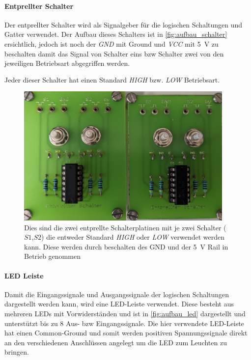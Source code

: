 \documentclass[12pt,english,ngerman]{scrartcl}
\begin{document}
\paragraph{Entprellter Schalter}
Der entprellter Schalter wird als Signalgeber für die logischen Schaltungen und
Gatter verwendet. Der Aufbau dieses Schalters ist in
\autoref{fig:aufbau_schalter} ersichtlich, jedoch ist noch der \textit{GND} mit
Ground und \textit{VCC} mit \SI{5}{\volt} zu beschalten damit das Signal von
Schalter eins bzw Schalter zwei von den jeweiligen Betriebsart abgegriffen
werden.

Jeder dieser Schalter hat einen Standard \textit{HIGH} bzw.
\textit{LOW} Betriebsart.

\begin{figure}[H]
  \centering
    \includegraphics[width=0.95\textwidth]{./figures/messungen/schalter.jpg}
  \caption{Dies sind die zwei entprellte Schalterplatinen mit je zwei Schalter
    ($S1$,$S2$) die entweder Standard \textit{HIGH} oder \textit{LOW} verwendet
    werden kann. Diese werden durch beschalten des GND und der \SI{5}{\volt}
    Rail in Betrieb genommen}
  \label{fig:aufbau_schalter}
\end{figure}


\paragraph{LED Leiste}
Damit die Eingangssignale und Ausgangssignale der logischen Schaltungen
dargestellt werden kann, wird eine LED-Leiste verwendet. Diese besteht aus
mehreren LEDs mit Vorwiderständen und ist in \autoref{fig:aufbau_led} dargestellt und
unterstützt bis zu 8 Aus- bzw Eingangssignale. Die hier verwendete LED-Leiste
hat einen Common-Ground und somit werden positiven Spannungssignale direkt an den
verschiedenen Anschlüssen angelegt um die LED zum Leuchten zu bringen.
\end{document}
